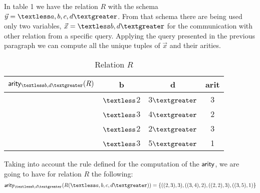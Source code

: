 \documentclass[12pt]{article}
\begin{document}
In table 1 we have the relation $R$ with the schema $\vec y=\textless a,b,c,d\textgreater$. From that schema there are being used only two variables, $\vec x=\textless b,d\textgreater$ for the communication with other relation from a specific query. Applying the query presented in the previous paragraph we can compute all the unique tuples of $\vec x$ and their arities.

\begin{table}[H]
\centering
\begin{tabular}{c c c c}
	$\arity{}_{\textless b,d\textgreater}(R)$ & b & d & arit \\ [0.2ex]
	\hline
	  & $\textless $2 & 3$\textgreater$ & 3\\
	  & $\textless $3 & 4$\textgreater$ & 2\\
	  & $\textless $2 & 2$\textgreater$ & 3\\
	  & $\textless $3 & 5$\textgreater$ & 1\\
\end{tabular}
\caption{Relation $R$}
\end{table}

Taking into account the rule defined for the computation of the $\textsf{arity}{}$, we are going to have for relation $R$ the following:
$$\arity{}_{\textless b,d\textgreater}(R(\textless a,b,c,d\textgreater))=\{((2,3),3),((3,4),2),((2,2),3),((3,5),1)\}$$
\end{document}

